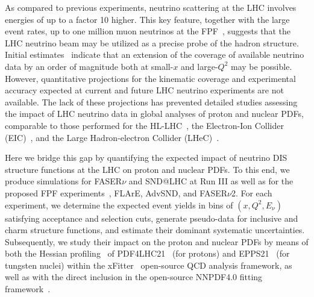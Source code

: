 As compared to  previous experiments,  neutrino
scattering at the LHC involves energies of up to a factor 10  higher.
%
This key feature, together with the large event rates,
up to one million muon neutrinos at the FPF~\cite{Anchordoqui:2021ghd,Feng:2022inv},
suggests that the LHC  neutrino beam may be utilized
as a precise probe of the hadron structure.
%
Initial estimates~\cite{Feng:2022inv} indicate that an extension of the coverage of
available neutrino data by an order of magnitude both at small-$x$
and large-$Q^2$ may be possible.
%
However, quantitative projections for the kinematic coverage
and experimental accuracy expected at current
and future LHC neutrino experiments are not available.
%
The lack of these projections has prevented detailed studies assessing the impact
of LHC neutrino data in global analyses of proton and nuclear PDFs, comparable to
those performed for the HL-LHC~\cite{AbdulKhalek:2018rok,Azzi:2019yne}, the Electron-Ion Collider (EIC)~\cite{AbdulKhalek:2021gbh,Khalek:2021ulf,AbdulKhalek:2019mzd}, and the
Large Hadron-electron Collider (LHeC)~\cite{AbdulKhalek:2019mps,LHeC:2020van,LHeCStudyGroup:2012zhm}. 

Here we bridge this gap by quantifying
the expected impact of  neutrino DIS structure functions at the LHC on proton and nuclear PDFs.
%
To this end, we produce simulations for  FASER$\nu$ and SND@LHC at Run III 
as well as for the proposed FPF experiments~\cite{Anchordoqui:2021ghd,Feng:2022inv,Batell:2021blf,Batell:2021aja}, FLArE, AdvSND, and FASER$\nu$2.
%
For each experiment, we determine the expected event yields in bins of $(x,Q^2,E_\nu)$
satisfying acceptance and selection cuts,
generate pseudo-data for  inclusive and charm 
structure functions, 
and estimate their dominant systematic uncertainties.
%
Subsequently, we study their impact on the proton and nuclear PDFs by means of both the Hessian profiling~\cite{Paukkunen:2014zia,  Schmidt:2018hvu, AbdulKhalek:2018rok, HERAFitterdevelopersTeam:2015cre}
of  PDF4LHC21~\cite{PDF4LHCWorkingGroup:2022cjn} (for protons) and EPPS21~\cite{Eskola:2021nhw}
(for tungsten nuclei)
within the {\sc\small xFitter}~\cite{Alekhin:2014irh, Bertone:2017tig, xFitter:2022zjb, xFitter:web} open-source QCD analysis framework,
as well as with the direct inclusion in the open-source NNPDF4.0 fitting framework~\cite{NNPDF:2021uiq}.

